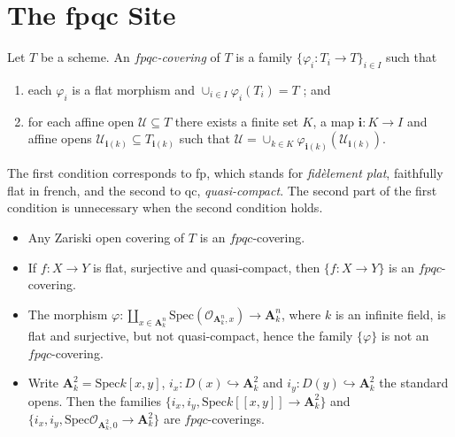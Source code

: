 \section{The fpqc Site}
\label{section-fpqc}

\begin{definition}
Let $T$ be a scheme. An \emph{$fpqc$-covering} of $T$ is a family $\{ \varphi_i 
: T_i \to T\}_{i \in I}$ such that
\begin{enumerate}
\item 
each $\varphi_i$ is a flat morphism and $\cup_{i\in I} \varphi_i (T_i) = T$ ; 
and
\item
for each affine open $\mathcal{U} \subseteq T$  there exists a finite set $K$, 
a map $\mathbf{i} : K \to I$ and affine opens $\mathcal{U}_{\mathbf{i}(k)} 
\subseteq T_{\mathbf{i}(k)}$ such that $\mathcal{U} = \cup_{k \in K} 
\varphi_{\mathbf{i}(k)}(\mathcal{U}_{\mathbf{i}(k)})$.
\end{enumerate}
\end{definition}

\begin{remark}
The first condition corresponds to fp, which stands for \emph{fid\`element 
plat}, faithfully flat in french, and the second to qc, \emph{quasi-compact}. 
The second part of the first condition is unnecessary when the second condition 
holds.
\end{remark}

\begin{example}
\begin{itemize}
\item Any Zariski open covering of $T$ is an $fpqc$-covering.
\item If $f: X \to Y$ is flat, surjective and quasi-compact, then $\{ f: X\to 
Y\}$ is an $fpqc$-covering.
\item The morphism $\varphi: \coprod_{x \in \mathbf{A}^n_k} \text{Spec} 
(\mathcal{O}_{\mathbf{A}^n_k,x}) \to \mathbf{A}^n_k $, where $k$ is an infinite 
field, is flat and surjective, but not quasi-compact, hence the family $\{ 
\varphi \}$ is not an $fpqc$-covering.
\item Write $\mathbf{A}^2_k = \text{Spec} k[x,y]$, $i_x : D(x) \hookrightarrow 
\mathbf{A}^2_k$ and $i_y : D(y) \hookrightarrow \mathbf{A}^2_k$ the standard 
opens. Then the families $\{i_x, i_y, \text{Spec} k[[ x,y ]] \to \mathbf{A}^2_k 
\}$ and $\{i_x, i_y, \text{Spec} \mathcal{O}_{\mathbf{A}^2_k,0} \to 
\mathbf{A}^2_k \}$ are $fpqc$-coverings.
\end{itemize}
\end{example}

